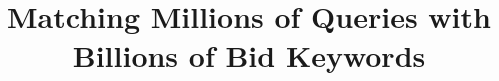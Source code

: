 \documentclass{sig-alternate}
\begin{document}
%

\title{Matching Millions of Queries with Billions of Bid Keywords}

\end{document}
